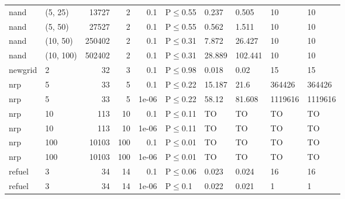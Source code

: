 \begin{longtable}{llrrrlllll}
 nand          & (5, 25)   &  	13727 &   2 & 0.1   & P$\leq$0.55  & 0.237  & 0.505   & 10      & 10      \\
 nand          & (5, 50)   &  	27527 &   2 & 0.1   & P$\leq$0.55  & 0.562  & 1.511   & 10      & 10      \\
 nand          & (10, 50)  & 	250402 &   2 & 0.1   & P$\leq$0.31  & 7.872  & 26.427  & 10      & 10      \\
 nand          & (10, 100) & 	502402 &   2 & 0.1   & P$\leq$0.31  & 28.889 & 102.441 & 10      & 10      \\
 newgrid       & 2         &     	32 &   3 & 0.1   & P$\leq$0.98  & 0.018  & 0.02    & 15      & 15      \\
 nrp           & 5         &     	33 &   5 & 0.1   & P$\leq$0.22  & 15.187 & 21.6    & 364426  & 364426  \\
 nrp           & 5         &     	33 &   5 & 1e-06 & P$\leq$0.22  & 58.12  & 81.608  & 1119616 & 1119616 \\
 nrp           & 10        &    	113 &  10 & 0.1   & P$\leq$0.11  & TO     & TO      & TO      & TO      \\
 nrp           & 10        &    	113 &  10 & 1e-06 & P$\leq$0.11  & TO     & TO      & TO      & TO      \\
 nrp           & 100       &  	10103 & 100 & 0.1   & P$\leq$0.01  & TO     & TO      & TO      & TO      \\
 nrp           & 100       &  	10103 & 100 & 1e-06 & P$\leq$0.01  & TO     & TO      & TO      & TO      \\
 refuel        & 3         &     	34 &  14 & 0.1   & P$\leq$0.06  & 0.023  & 0.024   & 16      & 16      \\
 refuel        & 3         &     	34 &  14 & 1e-06 & P$\leq$0.1   & 0.022  & 0.021   & 1       & 1       \\
\bottomrule
\end{longtable}
